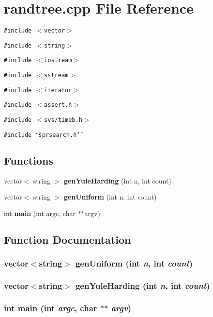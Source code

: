 \section{randtree.cpp File Reference}
\label{randtree_8cpp}
{\tt \#include $<$vector$>$}\par
{\tt \#include $<$string$>$}\par
{\tt \#include $<$iostream$>$}\par
{\tt \#include $<$sstream$>$}\par
{\tt \#include $<$iterator$>$}\par
{\tt \#include $<$assert.h$>$}\par
{\tt \#include $<$sys/timeb.h$>$}\par
{\tt \#include \char`\"{}sprsearch.h\char`\"{}}\par
\subsection*{Functions}
\begin{CompactItemize}
\item 
vector$<$ string $>$ {\bf gen\-Yule\-Harding} (int n, int count)
\item 
vector$<$ string $>$ {\bf gen\-Uniform} (int n, int count)
\item 
int {\bf main} (int argc, char $\ast$$\ast$argv)
\end{CompactItemize}


\subsection{Function Documentation}
\subsubsection{\setlength{\rightskip}{0pt plus 5cm}vector$<$string$>$ gen\-Uniform (int {\em n}, int {\em count})}\label{randtree_8cpp_a1}


\subsubsection{\setlength{\rightskip}{0pt plus 5cm}vector$<$string$>$ gen\-Yule\-Harding (int {\em n}, int {\em count})}\label{randtree_8cpp_a0}


\subsubsection{\setlength{\rightskip}{0pt plus 5cm}int main (int {\em argc}, char $\ast$$\ast$ {\em argv})}\label{randtree_8cpp_a2}


